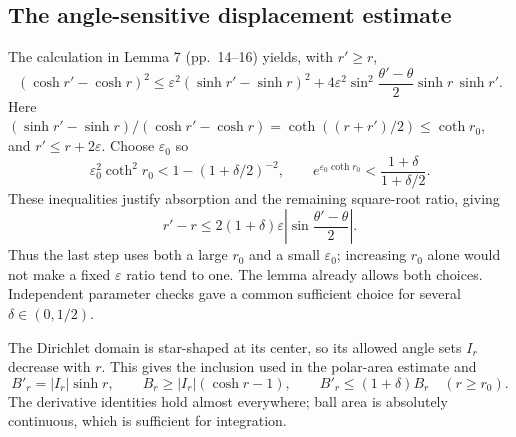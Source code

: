 \documentclass[10pt]{article}
\begin{document}
\subsection*{The angle-sensitive displacement estimate}
The calculation in Lemma 7 (pp. 14–16) yields, with \(r'\geq r\), \[(\cosh r'-\cosh r)^2
 \leq \varepsilon^2(\sinh r'-\sinh r)^2+
 4\varepsilon^2\sin^2\!\frac{\theta'-\theta}{2}\sinh r\,\sinh r'.\] Here \((\sinh r'-\sinh r)/(\cosh r'-\cosh r)
=\coth((r+r')/2)\leq\coth r_0\), and \(r'\leq r+2\varepsilon\). Choose \(\varepsilon_0\) so \[\varepsilon_0^2\coth^2r_0
 <1-(1+\delta/2)^{-2},\qquad
 e^{\varepsilon_0\coth r_0}
 <\frac{1+\delta}{1+\delta/2}.\] These inequalities justify absorption and the remaining square-root ratio, giving \[r'-r\leq2(1+\delta)\varepsilon
 \left|\sin\frac{\theta'-\theta}{2}\right|.\] Thus the last step uses both a large \(r_0\) and a small \(\varepsilon_0\); increasing \(r_0\) alone would not make a fixed \(\varepsilon\) ratio tend to one. The lemma already allows both choices. Independent parameter checks gave a common sufficient choice for several \(\delta\in(0,1/2)\).\par
The Dirichlet domain is star-shaped at its center, so its allowed angle sets \(I_r\) decrease with \(r\). This gives the inclusion used in the polar-area estimate and \[B'_r=|I_r|\sinh r,\qquad
 B_r\geq |I_r|(\cosh r-1),\qquad
 B'_r\leq(1+\delta)B_r\quad(r\geq r_0).\] The derivative identities hold almost everywhere; ball area is absolutely continuous, which is sufficient for integration.\par
\end{document}
